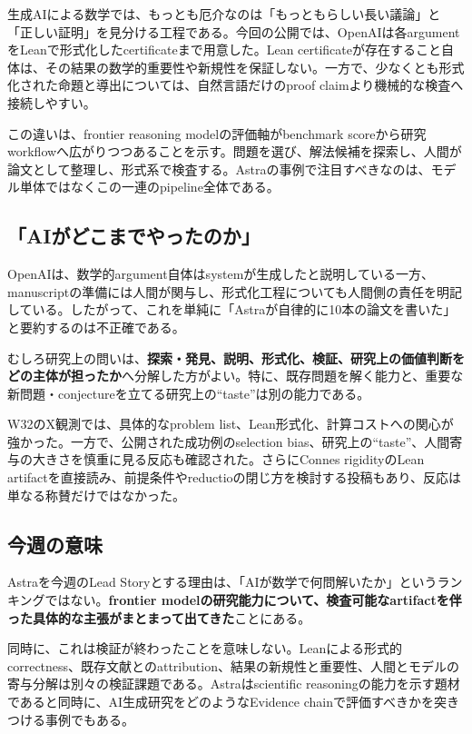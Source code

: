生成AIによる数学では、もっとも厄介なのは「もっともらしい長い議論」と「正しい証明」を見分ける工程である。今回の公開では、OpenAIは各argumentをLeanで形式化したcertificateまで用意した。Lean certificateが存在すること自体は、その結果の数学的重要性や新規性を保証しない。一方で、少なくとも形式化された命題と導出については、自然言語だけのproof claimより機械的な検査へ接続しやすい。

この違いは、frontier reasoning modelの評価軸がbenchmark scoreから研究workflowへ広がりつつあることを示す。問題を選び、解法候補を探索し、人間が論文として整理し、形式系で検査する。Astraの事例で注目すべきなのは、モデル単体ではなくこの一連のpipeline全体である。

\subsection*{「AIがどこまでやったのか」}

OpenAIは、数学的argument自体はsystemが生成したと説明している一方、manuscriptの準備には人間が関与し、形式化工程についても人間側の責任を明記している\cite{openai-astra-ten-advances}。したがって、これを単純に「Astraが自律的に10本の論文を書いた」と要約するのは不正確である。

むしろ研究上の問いは、\textbf{探索・発見、説明、形式化、検証、研究上の価値判断をどの主体が担ったか}へ分解した方がよい。特に、既存問題を解く能力と、重要な新問題・conjectureを立てる研究上の``taste''は別の能力である。

\begin{communitynote}
W32のX観測では、具体的なproblem list、Lean形式化、計算コストへの関心が強かった。一方で、公開された成功例のselection bias、研究上の``taste''、人間寄与の大きさを慎重に見る反応も確認された\cite{astra-x-deredleritt3r}。さらにConnes rigidityのLean artifactを直接読み、前提条件やreductioの閉じ方を検討する投稿もあり、反応は単なる称賛だけではなかった\cite{astra-x-manuflog}。
\end{communitynote}

\subsection*{今週の意味}

Astraを今週のLead Storyとする理由は、「AIが数学で何問解いたか」というランキングではない。\textbf{frontier modelの研究能力について、検査可能なartifactを伴った具体的な主張がまとまって出てきた}ことにある。

同時に、これは検証が終わったことを意味しない。Leanによる形式的correctness、既存文献とのattribution、結果の新規性と重要性、人間とモデルの寄与分解は別々の検証課題である。Astraはscientific reasoningの能力を示す題材であると同時に、AI生成研究をどのようなEvidence chainで評価すべきかを突きつける事例でもある。
